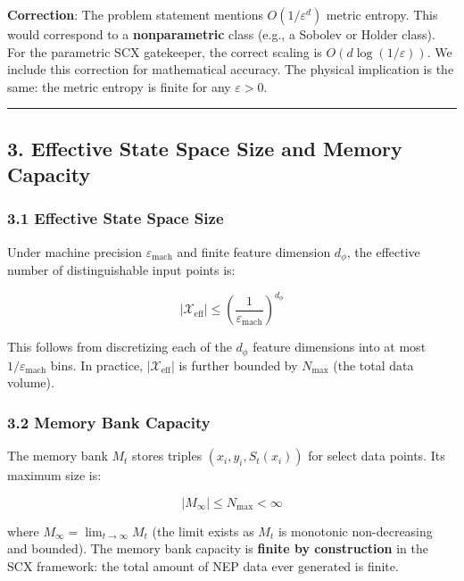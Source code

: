 \documentclass[
  12pt,
]{article}
\begin{document}
\textbf{Correction}: The problem statement mentions
\(O(1/\varepsilon^d)\) metric entropy. This would correspond to a
\textbf{nonparametric} class (e.g., a Sobolev or Holder class). For the
parametric SCX gatekeeper, the correct scaling is
\(O(d \log(1/\varepsilon))\). We include this correction for
mathematical accuracy. The physical implication is the same: the metric
entropy is finite for any \(\varepsilon > 0\).

\begin{center}\rule{0.5\linewidth}{0.5pt}\end{center}

\subsection{3. Effective State Space Size and Memory
Capacity}\label{effective-state-space-size-and-memory-capacity}

\subsubsection{3.1 Effective State Space
Size}\label{effective-state-space-size}

Under machine precision \(\varepsilon_{\text{mach}}\) and finite feature
dimension \(d_\phi\), the effective number of distinguishable input
points is:

\[|\mathcal{X}_{\text{eff}}| \leq \left( \frac{1}{\varepsilon_{\text{mach}}} \right)^{d_\phi}\]

This follows from discretizing each of the \(d_\phi\) feature dimensions
into at most \(1/\varepsilon_{\text{mach}}\) bins. In practice,
\(|\mathcal{X}_{\text{eff}}|\) is further bounded by \(N_{\text{max}}\)
(the total data volume).

\subsubsection{3.2 Memory Bank Capacity}\label{memory-bank-capacity}

The memory bank \(M_t\) stores triples \((x_i, y_i, S_t(x_i))\) for
select data points. Its maximum size is:

\[|M_\infty| \leq N_{\text{max}} < \infty\]

where \(M_\infty = \lim_{t\to\infty} M_t\) (the limit exists as \(M_t\)
is monotonic non-decreasing and bounded). The memory bank capacity is
\textbf{finite by construction} in the SCX framework: the total amount
of NEP data ever generated is finite.
\end{document}
